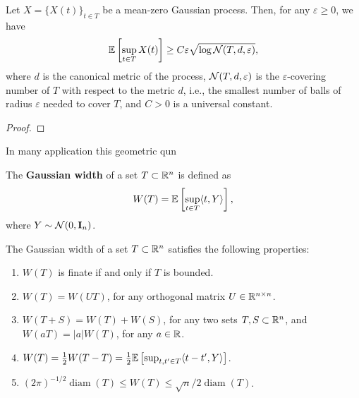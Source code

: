 \begin{theorem}
	Let \(X=\{X(t)\}_{t\in T}\) be a mean-zero Gaussian process. Then, for any \(\varepsilon\geq 0\), we have
	\begin{equation*}
		\mathbb{E}\left[\sup_{t\in T}X(t)\right]\geq C\varepsilon\sqrt{\log \mathcal{N}(T,d,\varepsilon)},
	\end{equation*}
	where \(d\) is the canonical metric of the process, \(\mathcal{N}(T,d,\varepsilon)\) is the \(\varepsilon\)-covering number of \(T\) with respect to the metric \(d\), i.e., the smallest number of balls of radius \(\varepsilon\) needed to cover \(T\), and \(C>0\) is a universal constant.
\end{theorem}

\begin{proof}

\end{proof}

In many application this geometric qun

\begin{definition}
	The \textbf{Gaussian width} of a set \(T\subset\mathbb{R}^{n}\) is defined as
	\begin{equation}
		W(T)=\mathbb{E}\left[\sup_{t\in T}\langle t,Y\rangle\right],
	\end{equation}
	where \(Y\sim\mathcal{N}(0,\mathbf{I}_{n})\).
\end{definition}

\begin{proposition}
	The Gaussian width of a set \(T\subset\mathbb{R}^{n}\) satisfies the following properties:
	\begin{enumerate}
		\item \(W(T)\) is finate if and only if \(T\) is bounded.
		\item \(W(T)=W(UT)\), for any orthogonal matrix \(U\in\mathbb{R}^{n\times n}\).
		\item \(W(T+S)=W(T)+W(S)\), for any two sets \(T,S\subset\mathbb{R}^{n}\), and \(W(aT)=|a|W(T)\), for any \(a\in\mathbb{R}\).
		\item \(W(T)=\frac{1}{2}W(T-T)=\frac{1}{2}\mathbb{E}\left[\sup_{t,t'\in T}\langle t-t',Y\rangle\right]\).
		\item \((2\pi)^{-1/2}\operatorname{diam}(T)\leq W(T)\leq\sqrt{n}/2\operatorname{diam}(T)\).
	\end{enumerate}
\end{proposition}

